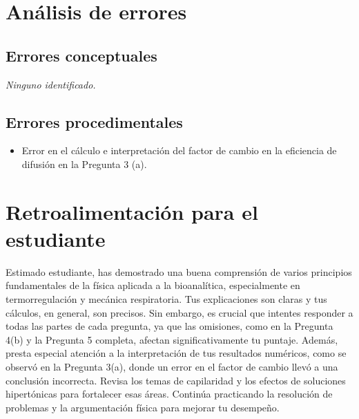 \documentclass[11pt,a4paper]{article}
\begin{document}
\section*{Análisis de errores}

\subsection*{Errores conceptuales}
\textit{Ninguno identificado.}

\subsection*{Errores procedimentales}
\begin{itemize}[leftmargin=1.5em, itemsep=2pt]
  \item Error en el cálculo e interpretación del factor de cambio en la eficiencia de difusión en la Pregunta 3 (a).
\end{itemize}

\section*{Retroalimentación para el estudiante}
\begin{tcolorbox}[cajaRecomendacion, title={Dirigido a: Daniersy Ramos}]
Estimado estudiante, has demostrado una buena comprensión de varios principios fundamentales de la física aplicada a la bioanalítica, especialmente en termorregulación y mecánica respiratoria. Tus explicaciones son claras y tus cálculos, en general, son precisos. Sin embargo, es crucial que intentes responder a todas las partes de cada pregunta, ya que las omisiones, como en la Pregunta 4(b) y la Pregunta 5 completa, afectan significativamente tu puntaje. Además, presta especial atención a la interpretación de tus resultados numéricos, como se observó en la Pregunta 3(a), donde un error en el factor de cambio llevó a una conclusión incorrecta. Revisa los temas de capilaridad y los efectos de soluciones hipertónicas para fortalecer esas áreas. Continúa practicando la resolución de problemas y la argumentación física para mejorar tu desempeño.
\end{tcolorbox}

\end{document}
